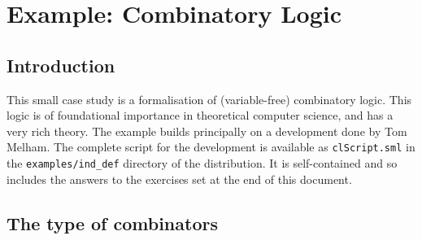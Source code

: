 \newcommand{\eos}{\hfill{}$\cdots\diamond\cdots$\hfill{}\vspace{5mm}}

\newcommand{\mathpredn}{\mathbin{-\!\!\!\mid\mid\!\rightarrow}}

\newcommand{\KC}{\con{K}}
\newcommand{\SC}{\con{S}}
\newcommand{\bk}{\char'134}


\chapter{Example: Combinatory Logic}
\label{chap:combin}

\section{Introduction}
\label{sec:Introduction}

This small case study is a formalisation of (variable-free)
combinatory logic.  This logic is of foundational importance in
theoretical computer science, and has a very rich theory.  The example
builds principally on a development done by Tom Melham.  The complete
script for the development is available as \texttt{clScript.sml} in
the \texttt{examples/ind\_def} directory of the distribution.  It is
self-contained and so includes the answers to the exercises set at the
end of this document.


\section{The type of combinators}
\label{sec:Type-Combinators}

